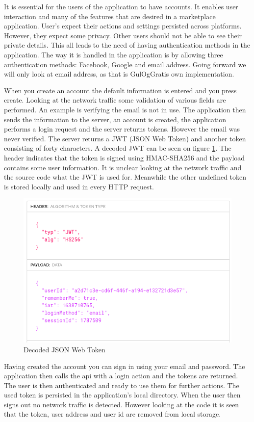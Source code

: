 It is essential for the users of the application to have accounts. It enables user interaction and many of the features that are desired in a marketplace application. User's expect their actions and settings persisted across platforms. However, they expect some privacy. Other users should not be able to see their private details. This all leads to the need of having authentication methods in the application. The way it is handled in the application is by allowing three authentication methods: Facebook, Google and email address. Going forward we will only look at email address, as that is GulOgGratis own implementation. 

When you create an account the default information is entered and you press create. Looking at the network traffic some validation of various fields are performed. An example is verifying the email is not in use. The application then sends the information to the server, an account is created, the application performs a login request and the server returns tokens. However the email was never verified. The server returns a JWT (JSON Web Token) and another token consisting of forty characters. A decoded JWT can be seen on figure \ref{fig:jwt_decoded}. The header indicates that the token is signed using HMAC-SHA256 and the payload contains some user information. It is unclear looking at the network traffic and the source code what the JWT is used for. Meanwhile the other undefined token is stored locally and used in every HTTP request.  

\begin{figure}[htbp]
    \centering
    \includegraphics[width=0.7\columnwidth]{../dynamic-analysis/pictures/jwt_decoded.png}
    \caption{Decoded JSON Web Token}
    \label{fig:jwt_decoded}
\end{figure}

Having created the account you can sign in using your email and password. The application then calls the api with a login action and the tokens are returned. The user is then authenticated and ready to use them for further actions. The used token is persisted in the application's local directory. When the user then signs out no network traffic is detected. However looking at the code it is seen that the token, user address and user id are removed from local storage.      

